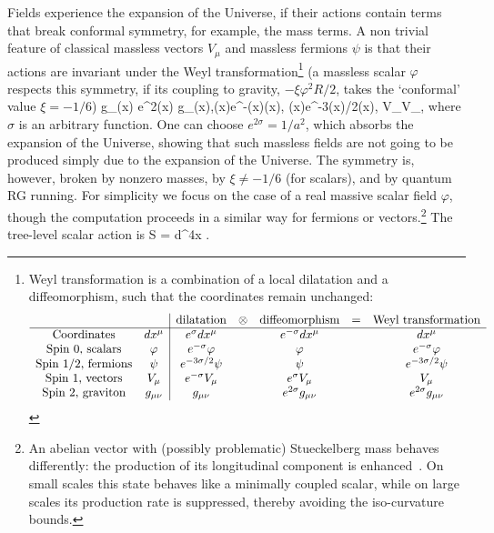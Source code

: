 Fields experience the expansion of the Universe, if their actions contain terms that break conformal symmetry, for example, the mass terms.
A non trivial feature of classical massless vectors $V_\mu$ and massless fermions $\psi$
is that their actions are invariant under the Weyl transformation\footnote{Weyl transformation
is a combination of a local dilatation and a diffeomorphism, such that the coordinates remain unchanged:
$$\begin{array}{cc|ccccc}
&& \hbox{dilatation} &\otimes &\hbox{diffeomorphism} &=& \hbox{Weyl transformation}\\ \hline
\hbox{Coordinates} & dx^\mu  &  e^\sigma dx^\mu &&e^{-\sigma} dx^\mu && dx^\mu\\
\hbox{Spin 0, scalars} &\varphi & e^{-\sigma} \varphi && \varphi &&e^{-\sigma} \varphi \\
\hbox{Spin 1/2, fermions} & \psi & e^{-3\sigma/2} \psi &&\psi &&  e^{-3\sigma/2} \psi\\
\hbox{Spin 1, vectors} &  V_{\mu} & e^{-\sigma}  V_{\mu} && e^{\sigma}  V_{\mu} &&V_{\mu}\\
\hbox{Spin 2, graviton} & g_{\mu\nu} &g_{\mu\nu} && e^{2\sigma} g_{\mu\nu} &&e^{2\sigma}  g_{\mu\nu} \\
\end{array}
$$}
(a massless scalar $\varphi$ respects this symmetry, if its coupling to gravity, $-\xi \varphi^2 R/2$, takes the
`conformal' value $\xi = -1/6$)
\beq g_{\mu\nu}(x) \to  e^{2\sigma(x)} g_{\mu\nu}(x),\quad \varphi(x)\rightarrow e^{-\sigma(x)}\varphi(x), \quad \psi(x)\rightarrow e^{-3\sigma(x)/2}\psi(x), \qquad V_\mu\rightarrow V_\mu, \label{eq:sigmaIntro}
\eeq
where $\sigma$ is an arbitrary function. One can choose $e^{2\sigma} = 1/a^2$, which absorbs the expansion of the Universe, showing that
such massless fields are not going to be produced simply due to the expansion of the Universe.
The symmetry is, however, broken by nonzero masses, by  $\xi \neq -1/6$ (for scalars), and by quantum RG running.
For simplicity we focus on the case of a real massive scalar field $\varphi$, though
the computation proceeds in a similar way for fermions or vectors.\footnote{An abelian vector with (possibly problematic)
Stueckelberg mass behaves differently: the production of its longitudinal component is enhanced~\cite{MassiveVectorInfl}.
On small scales this state behaves like a minimally coupled scalar, while on large scales its production rate is suppressed,
thereby avoiding the iso-curvature bounds.}
The tree-level scalar action is
\beq S = \int d^4x  .\eeq
